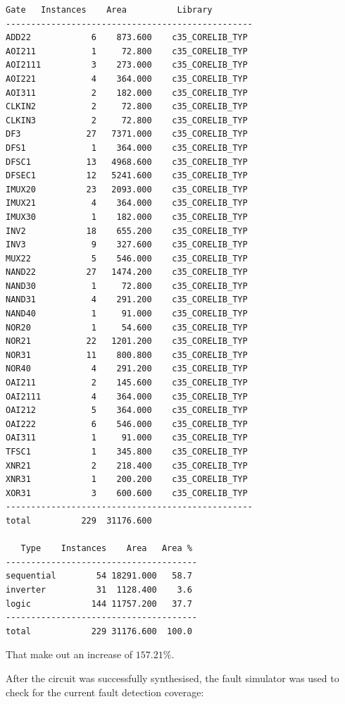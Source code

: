 \documentclass[12pt]{article}
\begin{document}
\begin{lstlisting}[caption={Gate count and circuit area of the full BIST system.},captionpos=b]
  Gate   Instances    Area          Library      
-------------------------------------------------
ADD22            6    873.600    c35_CORELIB_TYP 
AOI211           1     72.800    c35_CORELIB_TYP 
AOI2111          3    273.000    c35_CORELIB_TYP 
AOI221           4    364.000    c35_CORELIB_TYP 
AOI311           2    182.000    c35_CORELIB_TYP 
CLKIN2           2     72.800    c35_CORELIB_TYP 
CLKIN3           2     72.800    c35_CORELIB_TYP 
DF3             27   7371.000    c35_CORELIB_TYP 
DFS1             1    364.000    c35_CORELIB_TYP 
DFSC1           13   4968.600    c35_CORELIB_TYP 
DFSEC1          12   5241.600    c35_CORELIB_TYP 
IMUX20          23   2093.000    c35_CORELIB_TYP 
IMUX21           4    364.000    c35_CORELIB_TYP 
IMUX30           1    182.000    c35_CORELIB_TYP 
INV2            18    655.200    c35_CORELIB_TYP 
INV3             9    327.600    c35_CORELIB_TYP 
MUX22            5    546.000    c35_CORELIB_TYP 
NAND22          27   1474.200    c35_CORELIB_TYP 
NAND30           1     72.800    c35_CORELIB_TYP 
NAND31           4    291.200    c35_CORELIB_TYP 
NAND40           1     91.000    c35_CORELIB_TYP 
NOR20            1     54.600    c35_CORELIB_TYP 
NOR21           22   1201.200    c35_CORELIB_TYP 
NOR31           11    800.800    c35_CORELIB_TYP 
NOR40            4    291.200    c35_CORELIB_TYP 
OAI211           2    145.600    c35_CORELIB_TYP 
OAI2111          4    364.000    c35_CORELIB_TYP 
OAI212           5    364.000    c35_CORELIB_TYP 
OAI222           6    546.000    c35_CORELIB_TYP 
OAI311           1     91.000    c35_CORELIB_TYP 
TFSC1            1    345.800    c35_CORELIB_TYP 
XNR21            2    218.400    c35_CORELIB_TYP 
XNR31            1    200.200    c35_CORELIB_TYP 
XOR31            3    600.600    c35_CORELIB_TYP 
-------------------------------------------------
total          229  31176.600                    

   Type    Instances    Area   Area % 
--------------------------------------
sequential        54 18291.000   58.7 
inverter          31  1128.400    3.6 
logic            144 11757.200   37.7 
--------------------------------------
total            229 31176.600  100.0 
    \end{lstlisting} 
    
That make out an increase of $157.21\%$. 

After the circuit was successfully synthesised, the fault simulator was used to check for the current fault detection coverage:
\end{document}
